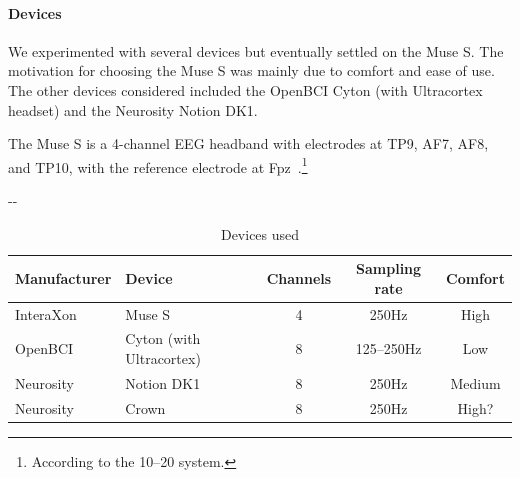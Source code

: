 \documentclass[a4paper]{article}
\newlength{\offsetpage}
\newenvironment{widepage}{\begin{adjustwidth}{-\offsetpage}{-\offsetpage}%
    \addtolength{\textwidth}{2\offsetpage}}%
{\end{adjustwidth}}
\begin{document}
\begin{refsection}
        \paragraph{Devices}

            We experimented with several devices but eventually settled on the Muse S. The motivation for choosing the Muse S was mainly due to comfort and ease of use. The other devices considered included the OpenBCI Cyton (with Ultracortex headset) and the Neurosity Notion DK1.

            The Muse S is a 4-channel EEG headband with electrodes at TP9, AF7, AF8, and TP10, with the reference electrode at Fpz~\cite{krigolson_choosing_2017}.\footnote{According to the 10--20 system.}

            \begin{widepage}
            \begin{table}
                \begin{tabular}{llccc}
                    \toprule
                    Manufacturer
                    & Device
                    & Channels
                    & Sampling rate
                    & Comfort
                    \\ 
                    \midrule
                    InteraXon
                    & Muse S
                    & 4
                    & 250Hz
                    & High \\
                 OpenBCI
                    & Cyton (with Ultracortex)
                    & 8
                    & 125--250Hz
                    & Low \\
                 Neurosity
                    & Notion DK1
                    & 8
                    & 250Hz
                    & Medium \\
                  Neurosity
                    & Crown
                    & 8
                    & 250Hz
                    & High? \\
                    \bottomrule
                \end{tabular}
                \caption{Devices used}\label{table:devices}
            \end{table}
            \end{widepage}


\end{refsection}
\end{document}
